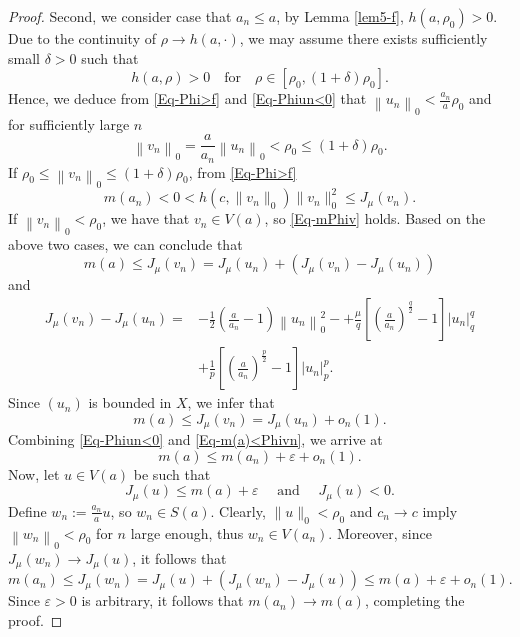 \documentclass[10pt,a4paper]{amsart}
\begin{document}
\begin{proof}
        Second, we consider case that $a_n \leq a$, by Lemma \ref{lem5-f},
        $ h\left(a, \rho_0\right) > 0 $.
        Due to the continuity of $\rho \rightarrow h(a, \cdot)$, we may assume there exists sufficiently small
        $\delta>0$ such that
        $$
        h\left(a, \rho\right) > 0\quad \text{for}\quad \rho \in\left[\rho_0, (1+\delta)\rho_0\right].
        $$
        Hence, we deduce from \eqref{Eq-Phi>f} and \eqref{Eq-Phiun<0} that
        $\left\| u_n\right\|_0<\frac{a_n}{a}  \rho_0$ and
        for sufficiently large $n$
        $$
        \left\| v_n\right\|_{0}=\frac{a}{a_n}\left\| u_n\right\|_{0}< \rho_0\leq(1+\delta)\rho_0.
        $$
        If $\rho_0\leq\left\|v_n\right\|_{0}\leq(1+\delta)\rho_0$, from
        \eqref{Eq-Phi>f}
        $$
        m(a_n)<0<h\left(c,\|v_n\|_{0}\right)\| v_n\|_{0}^{2}\leq J_\mu\left(v_n\right).
        $$
        If $\left\|v_n\right\|_{0}<\rho_0$, we have that $v_n \in V(a)$, so \eqref{Eq-mPhiv} holds. Based on the above two cases, we can conclude that
        \begin{equation}
            m(a) \leq J_\mu\left(v_n\right)=J_\mu\left(u_n\right)+\left(J_\mu\left(v_n\right)-J_\mu\left(u_n\right)\right)
        \end{equation}
        and
        \begin{equation}
            \begin{aligned}
                J_\mu\left(v_n\right) - J_\mu\left(u_n\right) = & -\frac{1}{2} \left( \frac{a}{a_n} - 1 \right) \left\| u_n\right\|_0^2
                -
                 + \frac{\mu}{q} \left[ \left( \frac{a}{a_n} \right)^{\frac{q}{2}} - 1 \right] \left|u_n\right|_q^q \\
                &+ \frac{1}{p} \left[ \left( \frac{a}{a_n} \right)^{\frac{p}{2}} - 1 \right] \left|u_n\right|_{p}^{p}.
            \end{aligned}
        \end{equation}
        Since $ (u_n) $ is bounded in $X$, {we infer that}
        \begin{equation}\label{Eq-m(a)<Phivn}
            m(a) \leq J_\mu\left(v_n\right)=J_\mu\left(u_n\right)+o_n(1).
        \end{equation}
        Combining \eqref{Eq-Phiun<0} and \eqref{Eq-m(a)<Phivn}, {we arrive at}
        $$
        m(a) \leq m\left(a_n\right)+\varepsilon+o_n(1) .
        $$
        Now, let $u \in V(a)$ be such that
        $$
        J_\mu(u) \leq m(a)+\varepsilon \quad \text { and } \quad J_\mu(u)<0 .
        $$
        Define $w_n:={\frac{a_n}{a}} u$, so $w_n \in S\left(a\right)$. Clearly, $\| u\|_{0}<\rho_0$ and $c_n \rightarrow c$ imply $\left\| w_n\right\|_{0}<\rho_0$ for $n$ large enough, thus $w_n \in V\left(a_n\right)$. Moreover, since $J_\mu\left(w_n\right) \rightarrow J_\mu(u)$, it follows that
        $$
        m\left(a_n\right) \leq J_\mu\left(w_n\right)=J_\mu(u)+\left(J_\mu\left(w_n\right)-J_\mu(u)\right) \leq m(a)+\varepsilon+o_n(1).
        $$
    Since $\varepsilon>0$ is arbitrary, it follows that $m\left(a_n\right) \rightarrow m(a)$, completing the proof.
    \end{proof}
\end{document}
